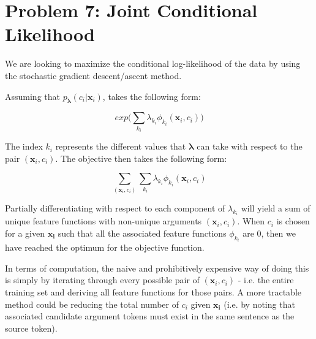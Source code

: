 \documentclass{article} %
\begin{document}
\section*{Problem 7: Joint Conditional Likelihood}
We are looking to maximize the conditional log-likelihood of the data by using the stochastic gradient descent/ascent method. 



Assuming that $p_{\boldsymbol{\lambda}}(c_i|\mathbf{x}_i)$, takes the following form:

\begin{equation}
exp\bigg(\sum_{k_i}\lambda_{k_i}\phi_{k_i}(\mathbf{x}_i,c_i)\bigg)
\end{equation}

The index $k_i$ represents the different values that $\boldsymbol{\lambda}$ can take with respect to the pair $(\mathbf{x}_i, c_i)$. The objective then takes the following form:

\begin{equation}
\sum_{(\mathbf{x}_i,c_i)}\sum_{k_i}\lambda_{k_i}\phi_{k_i}(\mathbf{x}_i,c_i)
\end{equation}

 Partially differentiating with respect to each component of $\lambda_{k_i}$ will yield a sum of unique feature functions with non-unique arguments $(\mathbf{x}_i, c_i)$. When $c_i$ is chosen for a given $\mathbf{x_i}$ such that all the associated feature functions $\phi_{k_i}$ are 0, then we have reached the optimum for the objective function.
 
 In terms of computation, the naive and prohibitively expensive way of doing this is simply by iterating through every possible pair of $(\mathbf{x}_i, c_i)$ - i.e. the entire training set and deriving all feature functions for those pairs. A more tractable method could be reducing the total number of $c_i$ given $\mathbf{x_i}$  (i.e. by noting that associated candidate argument tokens must exist in the same sentence as the source token). 

\printbibliography
\end{document}
